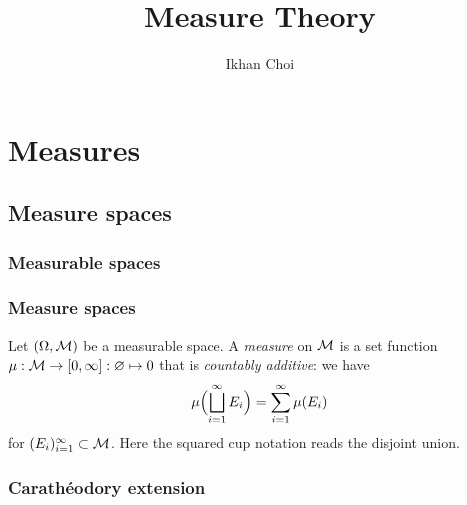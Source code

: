 \documentclass{../../large}
\begin{document}
\title{Measure Theory}
\author{Ikhan Choi}
\maketitle
\tableofcontents

\part{Measures}





\chapter{Measure spaces}


\section{Measurable spaces}

\begin{prb}

\end{prb}



\section{Measure spaces}

\begin{prb}
Let $(\Omega,\mathcal{M})$ be a measurable space.
A \emph{measure} on $\mathcal{M}$ is a set function $\mu:\mathcal{M}\to[0,\infty]:\varnothing\mapsto0$ that is \emph{countably additive}: we have
\[\mu\Bigl(\bigsqcup_{i=1}^\infty E_i\Bigr)=\sum_{i=1}^\infty\mu(E_i)\]
for $(E_i)_{i=1}^\infty\subset\mathcal{M}$.
Here the squared cup notation reads the disjoint union.
\end{prb}

\begin{prb}
\end{prb}

\begin{prb}
\end{prb}

\begin{prb}
\end{prb}



\section{Carath\'eodory extension}
\end{document}
